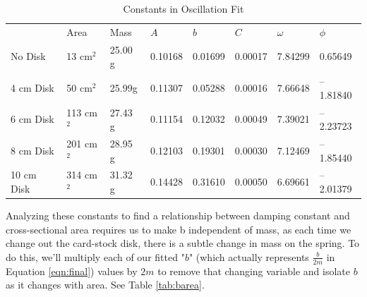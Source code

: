 \documentclass[12pt,letterpaper]{article}
\begin{document}
\begin{table}[ht]
\centering
\begin{tabular}{llllllll}
                                & Area                            & Mass                         & $A$                          & $b$                          & $C$                          & $\omega$                     & $\phi$                        \\ \cline{2-8} 
\multicolumn{1}{l|}{No Disk}    & \multicolumn{1}{l|}{13 cm$^2$}  & \multicolumn{1}{l|}{25.00 g} & \multicolumn{1}{l|}{0.10168} & \multicolumn{1}{l|}{0.01699} & \multicolumn{1}{l|}{0.00017} & \multicolumn{1}{l|}{7.84299} & \multicolumn{1}{l|}{0.65649}  \\ \cline{2-8} 
\multicolumn{1}{l|}{4 cm Disk}  & \multicolumn{1}{l|}{50 cm$^2$}  & \multicolumn{1}{l|}{25.99g}  & \multicolumn{1}{l|}{0.11307} & \multicolumn{1}{l|}{0.05288} & \multicolumn{1}{l|}{0.00016} & \multicolumn{1}{l|}{7.66648} & \multicolumn{1}{l|}{–1.81840} \\ \cline{2-8} 
\multicolumn{1}{l|}{6 cm Disk}  & \multicolumn{1}{l|}{113 cm$^2$} & \multicolumn{1}{l|}{27.43 g} & \multicolumn{1}{l|}{0.11154} & \multicolumn{1}{l|}{0.12032} & \multicolumn{1}{l|}{0.00049} & \multicolumn{1}{l|}{7.39021} & \multicolumn{1}{l|}{–2.23723} \\ \cline{2-8} 
\multicolumn{1}{l|}{8 cm Disk}  & \multicolumn{1}{l|}{201 cm$^2$} & \multicolumn{1}{l|}{28.95 g} & \multicolumn{1}{l|}{0.12103} & \multicolumn{1}{l|}{0.19301} & \multicolumn{1}{l|}{0.00030} & \multicolumn{1}{l|}{7.12469} & \multicolumn{1}{l|}{–1.85440} \\ \cline{2-8} 
\multicolumn{1}{l|}{10 cm Disk} & \multicolumn{1}{l|}{314 cm$^2$} & \multicolumn{1}{l|}{31.32 g} & \multicolumn{1}{l|}{0.14428} & \multicolumn{1}{l|}{0.31610} & \multicolumn{1}{l|}{0.00050} & \multicolumn{1}{l|}{6.69661} & \multicolumn{1}{l|}{–2.01379} \\ \cline{2-8} 
\end{tabular}
\caption{Constants in Oscillation Fit}
\label{tab:oscillation}
\end{table}

Analyzing these constants to find a relationship between damping constant and cross-sectional area requires us to make b independent of mass, as each time we change out the card-stock disk, there is a subtle change in mass on the spring. To do this, we'll multiply each of our fitted "$b$" (which actually represents $\frac{b}{2m}$ in Equation \ref{eqn:final}) values by $2m$ to remove that changing variable and isolate $b$ as it changes with area. See Table \ref{tab:barea}.
\end{document}
